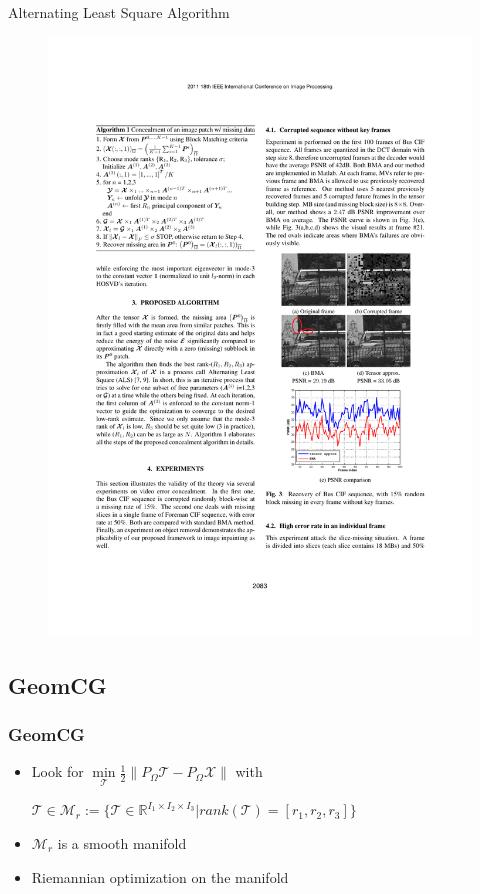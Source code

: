 \documentclass{beamer}
\begin{document}
\begin{frame}[fragile] %
\begin{block}{Alternating Least Square Algorithm}
\begin{figure}
\includegraphics[width=0.7\linewidth]{AlgoALS}
\end{figure}
\end{block}
\end{frame}

\subsection{GeomCG}

\begin{frame}
\frametitle{GeomCG}
\begin{itemize}
\item Look for $\min\limits_{\mathcal{T}} \frac{1}{2}\| P_{\Omega} \mathcal{T}-P_{\Omega} \mathcal{X} \|$ with \begin{center}$\mathcal{T}\in \mathcal{M}_r:=\{ \mathcal{T} \in \mathbb{R}^{I_1\times I_2\times I_3} | rank(\mathcal{T})=[r_1, r_2, r_3] \}$ \end{center}
\item $\mathcal{M}_r$ is a smooth manifold
\item Riemannian optimization on the manifold
\end{itemize}
\end{frame}
\end{document}
